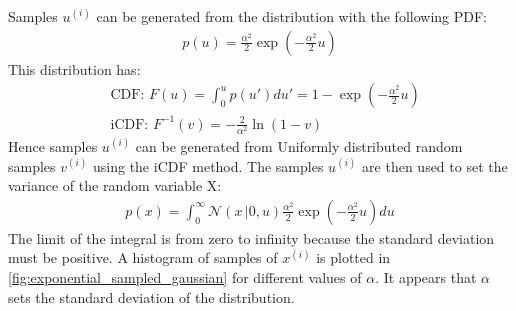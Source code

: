 \documentclass[a4paper]{article}
\begin{document}
Samples $u^{(i)}$ can be generated from the distribution with the following PDF:
\begin{align*}
    p(u) = \frac{\alpha^2}{2} \exp\left(-\frac{\alpha^2}{2} u \right)
\end{align*}
This distribution has:
\begin{align*}
    & \text{CDF: } F(u) = \int_0^u p(u') du' = 1 - \exp\left(-\frac{\alpha^2}{2} u\right) \\
    & \text{iCDF: } F^{-1}(v) = -\frac{2}{\alpha^2} \ln(1 - v)
\end{align*}
Hence samples $u^{(i)}$ can be generated from Uniformly distributed random samples $v^{(i)}$ using the iCDF method.
The samples $u^{(i)}$ are then used to set the variance of the random variable X:
\begin{align}\label{eq:exponential_sampled_gaussian}
    p(x) = \int_{0}^{\infty} \mathcal{N}(x\,|0, u) \frac{\alpha^2}{2} \exp\left(-\frac{\alpha^2}{2} u \right) du
\end{align}
The limit of the integral is from zero to infinity because the standard deviation must be positive.
A histogram of samples of $x^{(i)}$ is plotted in \autoref{fig:exponential_sampled_gaussian} for different values of
$\alpha$. It appears that $\alpha$ sets the standard deviation of the distribution.
\end{document}
